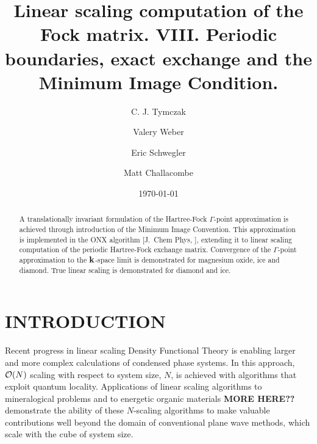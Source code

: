 \documentclass[prb,aps,nobibnotes,twocolumn,doublespace,twocolumngrid,superbib]{revtex4}
\begin{document}
\title{Linear scaling computation of the Fock matrix. VIII. Periodic \\
     boundaries, exact exchange and the Minimum Image Condition. }

\author{C. J. Tymczak}
\author{Valery Weber}
\author{Eric Schwegler}
\author{Matt Challacombe}


\date{\today}
\begin{abstract}
A translationally invariant formulation of the Hartree-Fock $\Gamma$-point approximation
is achieved through introduction of the Minimum Image Convention.  This approximation is implemented 
in the ONX algorithm [J.~Chem Phys, ], extending it to linear scaling computation of the periodic Hartree-Fock 
exchange matrix.  Convergence of the $\Gamma$-point approximation to the $\bf k$-space limit is demonstrated for 
magnesium oxide, ice and diamond.  True linear scaling is demonstrated for diamond and ice. 
\end{abstract}

\pacs{}

\maketitle


\section{INTRODUCTION}

Recent progress in linear scaling Density Functional Theory is enabling larger and 
more complex calculations of condensed phase systems.  In this approach, ${\cal O}(N)$
scaling with respect to system size, $N$, is achieved with algorithms that exploit 
quantum locality.  Applications of linear scaling algorithms to mineralogical problems 
\cite{MCraig04} and to energetic organic materials \cite{} {\bf MORE HERE??} demonstrate the ability 
of these $N$-scaling algorithms to make valuable contributions well beyond the domain of 
conventional plane wave methods, which scale with the cube of system size.  
\end{document}
